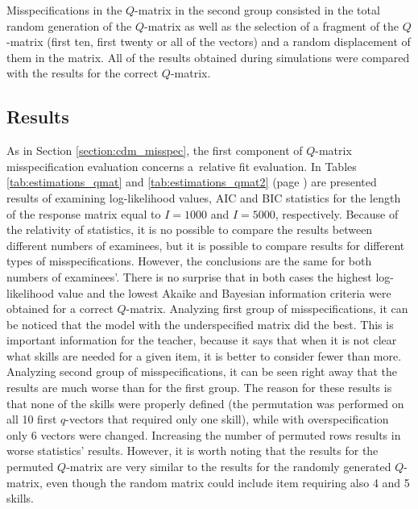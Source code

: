 \documentclass[english]{pwr_wmat_praca_dyplomowa}
\theoremstyle{plain}
\numberwithin{theorem}{chapter}
\theoremstyle{definition}
\numberwithin{theorem}{chapter}
\begin{document}
	Misspecifications in the $Q$-matrix in the second group consisted in the total random generation of the $Q$-matrix as well as the selection of a fragment of the $Q$-matrix (first ten, first twenty or all of the vectors) and a random displacement of them in the matrix. All of the results obtained during simulations were compared with the results for the correct $Q$-matrix.
	
	
	\subsection{Results}
	
	As in Section \ref{section:cdm_misspec}, the first component of $Q$-matrix misspecification evaluation concerns a~relative ﬁt evaluation. In Tables \ref{tab:estimations_qmat} and \ref{tab:estimations_qmat2} (page \pageref{tab:estimations_qmat2}) are presented results of examining log-likelihood values, AIC and BIC statistics for the length of the response matrix equal to $I=1000$ and $I=5000$, respectively. Because of the relativity of statistics, it is no possible to compare the results between different numbers of examinees, but it is possible to compare results for different types of misspecifications. However, the conclusions are the same for both numbers of examinees'. There is no surprise that in both cases the highest log-likelihood value and the lowest Akaike and Bayesian information criteria were obtained for a correct $Q$-matrix. Analyzing first group of misspecifications, it can be noticed that the model with the underspecified matrix did the best. This is important information for the teacher, because it says that when it is not clear what skills are needed for a given item, it is better to consider fewer than more. Analyzing second group of misspecifications, it can be seen right away that the results are much worse than for the first group. The reason for these results is that none of the skills were properly defined (the permutation was performed on all 10 first $q$-vectors that required only one skill), while with overspecification only 6 vectors were changed. Increasing the number of permuted rows results in worse statistics' results. However, it is worth noting that the results for the permuted $Q$-matrix are very similar to the results for the randomly generated $Q$-matrix, even though the random matrix could include item requiring also 4 and 5 skills.
	
\end{document}

